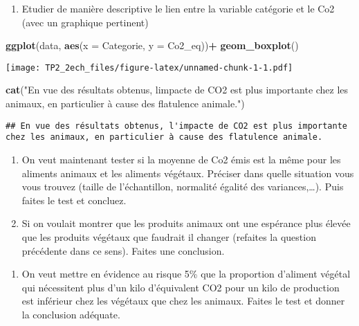 \documentclass[
]{article}
\newenvironment{Shaded}{\begin{snugshade}}{\end{snugshade}}
\newcommand{\AttributeTok}[1]{\textcolor[rgb]{0.13,0.29,0.53}{#1}}
\newcommand{\FunctionTok}[1]{\textcolor[rgb]{0.13,0.29,0.53}{\textbf{#1}}}
\newcommand{\NormalTok}[1]{#1}
\newcommand{\SpecialCharTok}[1]{\textcolor[rgb]{0.81,0.36,0.00}{\textbf{#1}}}
\newcommand{\StringTok}[1]{\textcolor[rgb]{0.31,0.60,0.02}{#1}}
\providecommand{\tightlist}{%
  \setlength{\itemsep}{0pt}\setlength{\parskip}{0pt}}
\begin{document}
\begin{enumerate}
\def\labelenumi{\alph{enumi}.}
\tightlist
\item
  Etudier de manière descriptive le lien entre la variable catégorie et
  le Co2 (avec un graphique pertinent)
\end{enumerate}

\begin{Shaded}
\begin{Highlighting}[]
\FunctionTok{ggplot}\NormalTok{(data, }\FunctionTok{aes}\NormalTok{(}\AttributeTok{x =}\NormalTok{ Categorie, }\AttributeTok{y =}\NormalTok{ Co2\_eq))}\SpecialCharTok{+}
  \FunctionTok{geom\_boxplot}\NormalTok{()}
\end{Highlighting}
\end{Shaded}

\texttt{[image: TP2\_2ech\_files/figure-latex/unnamed-chunk-1-1.pdf]}

\begin{Shaded}
\begin{Highlighting}[]
\FunctionTok{cat}\NormalTok{(}\StringTok{"En vue des résultats obtenus, l\textquotesingle{}impacte de CO2 est plus importante chez les animaux, en particulier à cause des flatulence animale."}\NormalTok{)}
\end{Highlighting}
\end{Shaded}

\begin{verbatim}
## En vue des résultats obtenus, l'impacte de CO2 est plus importante chez les animaux, en particulier à cause des flatulence animale.
\end{verbatim}

\begin{enumerate}
\def\labelenumi{\alph{enumi}.}
\setcounter{enumi}{1}
\item
  On veut maintenant tester si la moyenne de Co2 émis est la même pour
  les aliments animaux et les aliments végétaux. Préciser dans quelle
  situation vous vous trouvez (taille de l'échantillon, normalité
  égalité des variances,\ldots). Puis faites le test et concluez.
\item
  Si on voulait montrer que les produits animaux ont une espérance plus
  élevée que les produits végétaux que faudrait il changer (refaites la
  question précédente dans ce sens). Faites une conclusion.
\end{enumerate}

\begin{enumerate}
\def\labelenumi{\arabic{enumi}.}
\setcounter{enumi}{2}
\tightlist
\item
  On veut mettre en évidence au risque 5\% que la proportion d'aliment
  végétal qui nécessitent plus d'un kilo d'équivalent CO2 pour un kilo
  de production est inférieur chez les végétaux que chez les animaux.
  Faites le test et donner la conclusion adéquate.
\end{enumerate}
\end{document}
